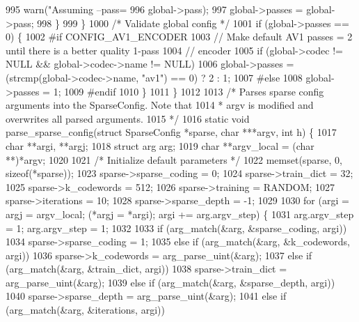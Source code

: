 \begin{DoxyCodeInclude}
{{{{{{{{{{{{{{995       warn(\textcolor{stringliteral}{"Assuming --pass=%
996           global->pass);
997       global->passes = global->pass;
998     \}
999   \}
1000   \textcolor{comment}{/* Validate global config */}
1001   \textcolor{keywordflow}{if} (global->passes == 0) \{
1002 \textcolor{preprocessor}{#if CONFIG\_AV1\_ENCODER}
1003     \textcolor{comment}{// Make default AV1 passes = 2 until there is a better quality 1-pass}
1004     \textcolor{comment}{// encoder}
1005     \textcolor{keywordflow}{if} (global->codec != NULL && global->codec->name != NULL)
1006       global->passes = (strcmp(global->codec->name, \textcolor{stringliteral}{"av1"}) == 0) ? 2 : 1;
1007 \textcolor{preprocessor}{#else}
1008     global->passes = 1;
1009 \textcolor{preprocessor}{#endif}
1010   \}
1011 \}
1012 
1013 \textcolor{comment}{/* Parses sparse config arguments into the SparseConfig. Note that}
1014 \textcolor{comment}{ * argv is modified and overwrites all parsed arguments.}
1015 \textcolor{comment}{ */}
1016 \textcolor{keyword}{static} \textcolor{keywordtype}{void} parse\_sparse\_config(\textcolor{keyword}{struct} SparseConfig *sparse, \textcolor{keywordtype}{char} ***argv, \textcolor{keywordtype}{int} h) \{
1017   \textcolor{keywordtype}{char} **argi, **argj;
1018   \textcolor{keyword}{struct }arg arg;
1019   \textcolor{keywordtype}{char} **argv\_local = (\textcolor{keywordtype}{char} **)*argv;
1020 
1021   \textcolor{comment}{/* Initialize default parameters */}
1022   memset(sparse, 0, \textcolor{keyword}{sizeof}(*sparse));
1023   sparse->sparse\_coding = 0;
1024   sparse->train\_dict = 32;
1025   sparse->k\_codewords = 512;
1026   sparse->training = RANDOM;
1027   sparse->iterations = 10;
1028   sparse->sparse\_depth = -1;
1029 
1030   \textcolor{keywordflow}{for} (argi = argj = argv\_local; (*argj = *argi); argi += arg.argv\_step) \{
1031     arg.argv\_step = 1;     arg.argv\_step = 1;
1032 
1033     \textcolor{keywordflow}{if} (arg\_match(&arg, &sparse\_coding, argi))
1034       sparse->sparse\_coding = 1;
1035     \textcolor{keywordflow}{else} if (arg\_match(&arg, &k\_codewords, argi))
1036       sparse->k\_codewords = arg\_parse\_uint(&arg);
1037     \textcolor{keywordflow}{else} \textcolor{keywordflow}{if} (arg\_match(&arg, &train\_dict, argi))
1038       sparse->train\_dict = arg\_parse\_uint(&arg);
1039     \textcolor{keywordflow}{else} \textcolor{keywordflow}{if} (arg\_match(&arg, &sparse\_depth, argi))
1040       sparse->sparse\_depth = arg\_parse\_uint(&arg);
1041     \textcolor{keywordflow}{else} \textcolor{keywordflow}{if} (arg\_match(&arg, &iterations, argi))
}}}}}}}}}}}}}}}
\end{DoxyCodeInclude}
